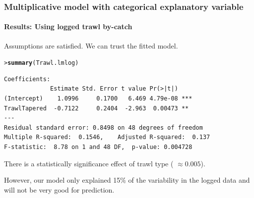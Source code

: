 \documentclass{beamer}\usepackage[]{graphicx}\usepackage[]{xcolor}
\makeatletter
\newcommand{\hlstd}[1]{\textcolor[rgb]{0.345,0.345,0.345}{#1}}%
\newcommand{\hlkwd}[1]{\textcolor[rgb]{0.737,0.353,0.396}{\textbf{#1}}}%
\newenvironment{kframe}{%
 \def\at@end@of@kframe{}%
 \ifinner\ifhmode%
  \def\at@end@of@kframe{\end{minipage}}%
  \begin{minipage}{\columnwidth}%
 \fi\fi%
 \def\FrameCommand##1{\hskip\@totalleftmargin \hskip-\fboxsep
 \colorbox{shadecolor}{##1}\hskip-\fboxsep
     \hskip-\linewidth \hskip-\@totalleftmargin \hskip\columnwidth}%
 \MakeFramed {\advance\hsize-\width
   \@totalleftmargin\z@ \linewidth\hsize
   \@setminipage}}%
 {\par\unskip\endMakeFramed%
 \at@end@of@kframe}
\newenvironment{knitrout}{}{} %
\makeatother
\begin{document}
\begin{frame}[fragile]
\frametitle{Multiplicative model with categorical explanatory variable}
\framesubtitle{Results: Using logged trawl by-catch}
Assumptions are satisfied. We can trust the fitted model.

\begin{knitrout}\scriptsize
{}\color{fgcolor}\begin{kframe}
\begin{alltt}
\hlstd{> }\hlkwd{summary}\hlstd{(Trawl.lmlog)}
\end{alltt}
\end{kframe}
\end{knitrout}

\begin{knitrout}\scriptsize
{}\color{fgcolor}\begin{kframe}
\begin{verbatim}
Coefficients:
             Estimate Std. Error t value Pr(>|t|)    
(Intercept)    1.0996     0.1700   6.469 4.79e-08 ***
TrawlTapered  -0.7122     0.2404  -2.963  0.00473 ** 
---
Residual standard error: 0.8498 on 48 degrees of freedom
Multiple R-squared:  0.1546,	Adjusted R-squared:  0.137 
F-statistic:  8.78 on 1 and 48 DF,  p-value: 0.004728
\end{verbatim}
\end{kframe}
\end{knitrout}
There is a statistically significance effect of trawl type (\pval{} $\approx 0.005$).

However, our model only explained 15\% of the variability in the logged data and 
will not be very good for prediction.
\end{frame}
\end{document}
